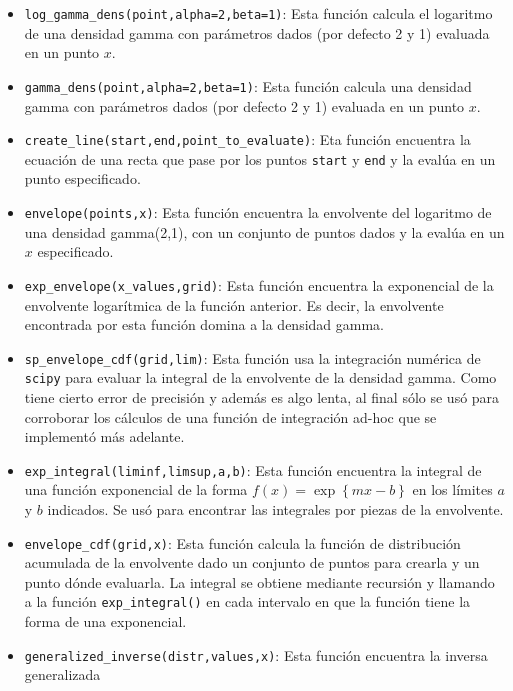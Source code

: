 \documentclass{article}
\begin{document}
\begin{enumerate}
    \begin{itemize}
        \item \texttt{log\_gamma\_dens(point,alpha=2,beta=1)}: Esta función calcula el logaritmo 
        de una densidad gamma con parámetros dados (por defecto 2 y 1) evaluada en un punto $x$.
        \item \texttt{gamma\_dens(point,alpha=2,beta=1)}: Esta función calcula una densidad gamma 
        con parámetros dados (por defecto 2 y 1) evaluada en un punto $x$.
        \item \texttt{create\_line(start,end,point\_to\_evaluate)}: Eta función encuentra la ecuación 
        de una recta que pase por los puntos \texttt{start} y \texttt{end} y la evalúa en un punto
        especificado.
        \item \texttt{envelope(points,x)}: Esta función encuentra la envolvente del logaritmo de una
        densidad gamma(2,1), con un conjunto de puntos dados y la evalúa en un $x$ especificado.
        \item \texttt{exp\_envelope(x\_values,grid)}: Esta función encuentra la exponencial de la envolvente
        logarítmica de la función anterior. Es decir, la envolvente encontrada por esta función domina
        a la densidad gamma.
        \item \texttt{sp\_envelope\_cdf(grid,lim)}: Esta función usa la integración numérica de \texttt{scipy}
        para evaluar la integral de la envolvente de la densidad gamma. Como tiene cierto error de precisión
        y además es algo lenta, al final sólo se usó para corroborar los cálculos de una función de integración
        ad-hoc que se implementó más adelante.
        \item \texttt{exp\_integral(liminf,limsup,a,b)}: Esta función encuentra la integral de una función
        exponencial de la forma $f(x) = \exp\left\{ m x - b \right\}$ en los límites $a$ y $b$ indicados. Se 
        usó para encontrar las integrales por piezas de la envolvente.
        \item \texttt{envelope\_cdf(grid,x)}: Esta función calcula la función de distribución acumulada 
        de la envolvente dado un conjunto de puntos para crearla y un punto dónde evaluarla. La integral
        se obtiene mediante recursión y llamando a la función \texttt{exp\_integral()} en cada intervalo
        en que la función tiene la forma de una exponencial.
        \item \texttt{generalized\_inverse(distr,values,x)}: Esta función encuentra la inversa generalizada

\end{itemize}
\end{enumerate}
\end{document}
